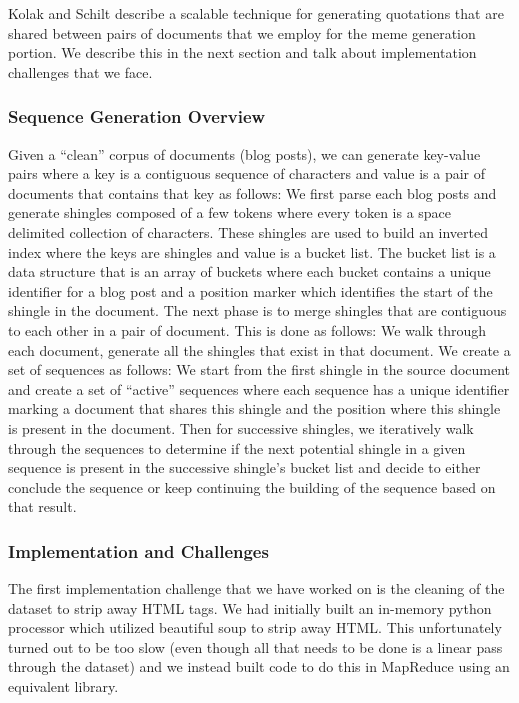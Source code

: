 \documentclass{acm_proc_article-sp}
\begin{document}
Kolak and Schilt \cite{kolak2008generating} describe a scalable technique for generating quotations that are shared between pairs of documents that we employ for the meme generation portion. We describe this in the next section and talk about implementation challenges that we face.

\subsubsection{Sequence Generation Overview}
Given a ``clean'' corpus of documents (blog posts), we can generate key-value pairs where a key is a contiguous sequence of characters and value is a pair of documents that contains that key as follows: We first parse each blog posts and generate shingles composed of a few tokens where every token is a space delimited collection of characters. These shingles are used to build an inverted index where the keys are shingles and value is a bucket list. The bucket list is a data structure that is an array of buckets where each bucket contains a unique identifier for a blog post and a position marker which identifies the start of the shingle in the document. The next phase is to merge shingles that are contiguous to each other in a pair of document. This is done as follows: We walk through each document, generate all the shingles that exist in that document. We create a set of sequences as follows: We start from the first shingle in the source document and create a set of ``active'' sequences where each sequence has a unique identifier marking a document that shares this shingle and the position where this shingle is present in the document. Then for successive shingles, we iteratively walk through the sequences to determine if the next potential shingle in a given sequence is present in the successive shingle's bucket list and decide to either conclude the sequence or keep continuing the building of the sequence based on that result. 

\subsubsection{Implementation and Challenges}
The first implementation challenge that we have worked on is the cleaning of the dataset to strip away HTML tags. We had initially built an in-memory python processor which utilized beautiful soup to strip away HTML. This unfortunately turned out to be too slow (even though all that needs to be done is a linear pass through the dataset) and we instead built code to do this in MapReduce using an equivalent library. 
\end{document}
